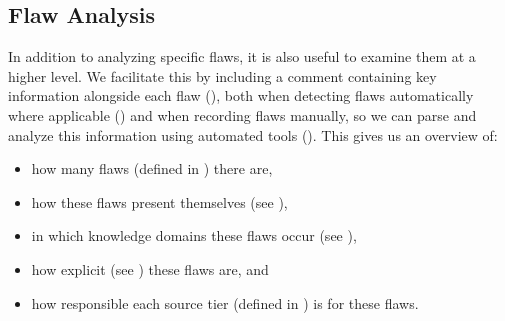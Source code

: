 \subsection{Flaw Analysis}\label{flaw-analysis}

In addition to analyzing specific flaws, it is also useful to examine them at
a higher level. We facilitate this by including a comment containing key
information alongside each flaw (), both when
detecting flaws automatically where applicable () and
when recording flaws manually, so we can parse and analyze this information
using automated tools (). This gives us an overview of:
\begin{itemize}
    \item how many flaws (defined in ) there are,
    \item how these flaws present themselves (see ),
    \item in which knowledge domains these flaws occur (see ),
    \item how explicit (see ) these flaws are, and
    \item how responsible each source tier (defined in ) is
          for these flaws.
\end{itemize}

